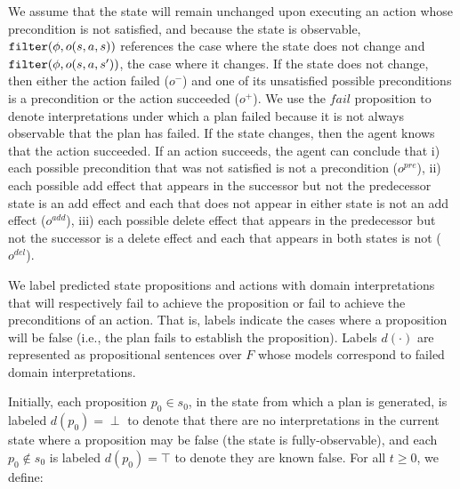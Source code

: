 \documentclass{article}
\begin{document}
\noindent We assume that the state will remain unchanged upon executing
an action whose precondition is not satisfied, and because the
state is observable, ${\tt filter}(\phi, o(s, a, s))$ references the case where
the state does not change and ${\tt filter}(\phi, o(s, a, s'))$, the case where
it changes.  If the state does not change, then either the action failed
($o^-$) and one of its unsatisfied possible preconditions is a precondition  or
the action succeeded ($o^+$).  We use the $fail$ proposition to denote
interpretations under which a plan failed because it is not always observable
that the plan has failed. If the state changes, then the agent knows that the
action succeeded. If an action  succeeds, the agent can conclude that i) each possible precondition that was not satisfied is not a precondition ($o^{pre}$), ii) each possible add effect that
appears in the successor but not the predecessor state is an add effect and each that does not appear in either state is not an add 
effect ($o^{add}$), iii) each possible delete effect that appears in the
predecessor but not the successor is a delete effect and each that  appears in both states is
not ($o^{del}$).



 We label predicted state propositions and actions with domain
interpretations that will respectively fail to achieve the proposition or fail
to achieve the preconditions of an action.  That is, labels indicate the cases
where a proposition will be false (i.e., the plan fails to establish the
proposition). Labels $d(\cdot)$ are represented as  propositional sentences over
$F$ whose models correspond to failed domain interpretations.

Initially, each proposition $p_0 \in s_0$, in the state from which a plan is
generated, is labeled $d(p_0) = \perp$ to denote that there are no
interpretations in the current state where a proposition may be false (the state is fully-observable), and each $p_0 \not\in
s_0$ is labeled $d(p_0)=\top$ to denote they are known false.
For all $t \geq 0$, we define:
\end{document}
